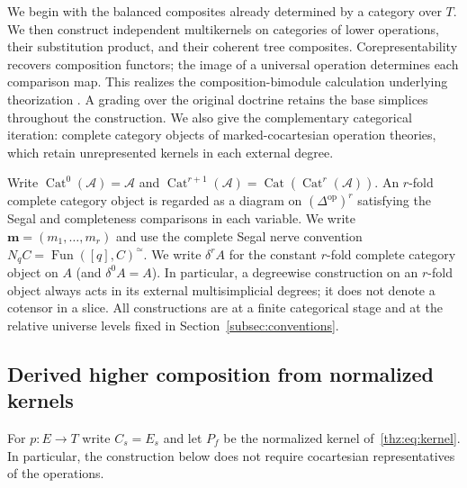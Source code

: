 \documentclass[oneside]{article}
\theoremstyle{plain}
\theoremstyle{definition}
\theoremstyle{remark}
\newcommand{\Fun}{\operatorname{Fun}}
\newcommand{\core}{\simeq}
\newcommand{\op}{\mathrm{op}}
\begin{document}
We begin with the balanced composites already determined by a category
over $T$. We then construct independent multikernels on categories of
lower operations, their substitution product, and their coherent tree
composites. Corepresentability recovers composition functors; the image
of a universal operation determines each comparison map. This realizes
the composition-bimodule calculation underlying theorization
\cite[\S2.4]{Matsuoka2017}. A grading over the original doctrine
retains the base simplices throughout the construction. We also give the
complementary categorical iteration: complete category objects of
marked-cocartesian operation theories, which retain unrepresented
kernels in each external degree.

Write $\operatorname{Cat}^0(\mathcal A)=\mathcal A$ and
$\operatorname{Cat}^{r+1}(\mathcal A)
 =\operatorname{Cat}(\operatorname{Cat}^r(\mathcal A))$.
An $r$-fold complete category object is regarded as a diagram on
$(\Delta^{\op})^r$ satisfying the Segal and completeness comparisons in
each variable.  We write $\mathbf m=(m_1,\ldots,m_r)$ and use the
complete Segal nerve convention $N_qC=\Fun([q],C)^\core$.
We write $\delta^r A$ for the constant $r$-fold complete category
object on $A$ (and $\delta^0 A=A$).  In particular, a degreewise
construction on an $r$-fold object always acts in its external
multisimplicial degrees; it does not denote a cotensor in a slice.
All constructions are at a finite categorical stage and at the
relative universe levels fixed in Section~\ref{subsec:conventions}.

\subsection{Derived higher composition from normalized kernels}
\label{subsec:derived-higher-composition}

For $p:E\to T$ write $C_s=E_s$ and let $P_f$ be the normalized
kernel of~\eqref{thz:eq:kernel}. In particular, the construction
below does not require cocartesian representatives of the operations.
\end{document}
